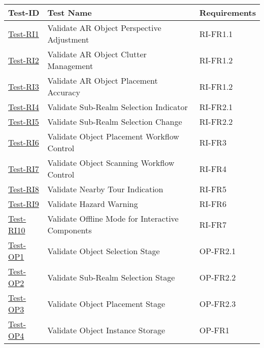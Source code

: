 \documentclass[12pt, titlepage]{article}
\begin{document}
\begin{table}[htpb!]
  \centering
  \begin{tabular}{|l|p{8cm}|p{3cm}|}
    \hline
    \textbf{Test-ID}                      & \textbf{Test Name}                                 & \textbf{Requirements} \\
    \hline
    \hyperref[itm:Test-RI1]{Test-RI1}     & Validate AR Object Perspective Adjustment          & RI-FR1.1              \\
    \hline
    \hyperref[itm:Test-RI2]{Test-RI2}     & Validate AR Object Clutter Management              & RI-FR1.2              \\
    \hline
    \hyperref[itm:Test-RI3]{Test-RI3}     & Validate AR Object Placement Accuracy              & RI-FR1.2              \\
    \hline
    \hyperref[itm:Test-RI4]{Test-RI4}     & Validate Sub-Realm Selection Indicator             & RI-FR2.1              \\
    \hline
    \hyperref[itm:Test-RI5]{Test-RI5}     & Validate Sub-Realm Selection Change                & RI-FR2.2              \\
    \hline
    \hyperref[itm:Test-RI6]{Test-RI6}     & Validate Object Placement Workflow Control         & RI-FR3                \\
    \hline
    \hyperref[itm:Test-RI7]{Test-RI7}     & Validate Object Scanning Workflow Control          & RI-FR4                \\
    \hline
    \hyperref[itm:Test-RI8]{Test-RI8}     & Validate Nearby Tour Indication                    & RI-FR5                \\
    \hline
    \hyperref[itm:Test-RI9]{Test-RI9}     & Validate Hazard Warning                            & RI-FR6                \\
    \hline
    \hyperref[itm:Test-RI10]{Test-RI10}   & Validate Offline Mode for Interactive Components   & RI-FR7                \\
    \hline
    \hyperref[itm:Test-OP1]{Test-OP1}     & Validate Object Selection Stage                    & OP-FR2.1              \\
    \hline
    \hyperref[itm:Test-OP2]{Test-OP2}     & Validate Sub-Realm Selection Stage                 & OP-FR2.2              \\
    \hline
    \hyperref[itm:Test-OP3]{Test-OP3}     & Validate Object Placement Stage                    & OP-FR2.3              \\
    \hline
    \hyperref[itm:Test-OP4]{Test-OP4}     & Validate Object Instance Storage                   & OP-FR1                \\

\end{tabular}
\end{table}
\end{document}
